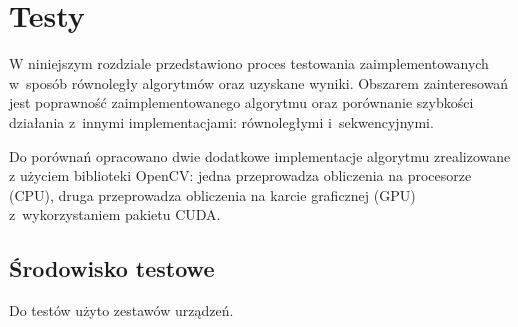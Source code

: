 \section{Testy}
\label{cha:testy}

W niniejszym rozdziale przedstawiono proces testowania zaimplementowanych w~sposób równoległy algorytmów oraz uzyskane wyniki. Obszarem zainteresowań jest poprawność zaimplementowanego algorytmu oraz porównanie szybkości działania z~innymi implementacjami: równoległymi i~sekwencyjnymi.

Do porównań opracowano dwie dodatkowe implementacje algorytmu zrealizowane z użyciem biblioteki OpenCV: jedna przeprowadza obliczenia na procesorze (CPU), druga przeprowadza obliczenia na karcie graficznej (GPU) z~wykorzystaniem pakietu CUDA.

\subsection{Środowisko testowe}
\label{sec:srodowiskoTesty}

Do testów użyto zestawów urządzeń.

